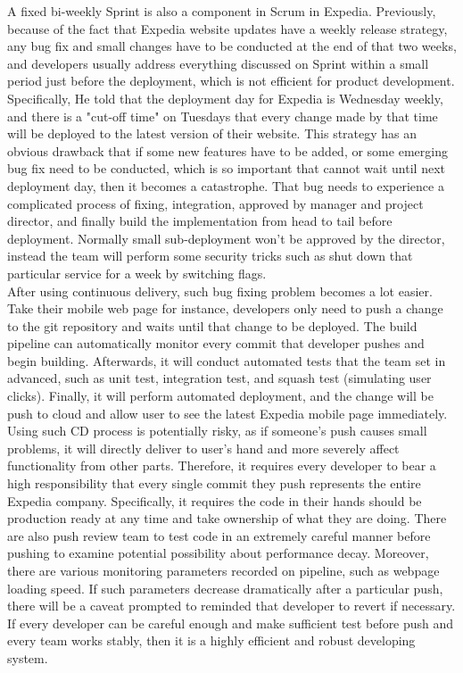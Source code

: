 \documentclass[11pt]{article}
\begin{document}
A fixed bi-weekly Sprint is also a component in Scrum in Expedia. Previously, because of the fact that Expedia website updates have a weekly release strategy, any bug fix and small changes have to be conducted at the end of that two weeks, and developers usually address everything discussed on Sprint within a small period just before the deployment, which is not efficient for product development. Specifically, He told that the deployment day for Expedia is Wednesday weekly, and there is a "cut-off time" on Tuesdays that every change made by that time will be deployed to the latest version of their website. This strategy has an obvious drawback that if some new features have to be added, or some emerging bug fix need to be conducted, which is so important that cannot wait until next deployment day, then it becomes a catastrophe. That bug needs to experience a complicated process of fixing, integration, approved by manager and project director, and finally build the implementation from head to tail before deployment. Normally small sub-deployment won't be approved by the director, instead the team will perform some security tricks such as shut down that particular service for a week by switching flags. \\[10px]
After using continuous delivery, such bug fixing problem becomes a lot easier. Take their mobile web page for instance, developers only need to push a change to the git repository and waits until that change to be deployed. The build pipeline can automatically monitor every commit that developer pushes and begin building. Afterwards, it will conduct automated tests that the team set in advanced, such as unit test, integration test, and squash test (simulating user clicks). Finally, it will perform automated deployment, and the change will be push to cloud and allow user to see the latest Expedia mobile page immediately. Using such CD process is potentially risky, as if someone's push causes small problems, it will directly deliver to user's hand and more severely affect functionality from other parts. Therefore, it requires every developer to bear a high responsibility that every single commit they push represents the entire Expedia company. Specifically, it requires the code in their hands should be production ready at any time and take ownership of what they are doing. There are also push review team to test code in an extremely careful manner before pushing to examine potential possibility about performance decay. Moreover, there are various monitoring parameters recorded on pipeline, such as webpage loading speed. If such parameters decrease dramatically after a particular push, there will be a caveat prompted to reminded that developer to revert if necessary. If every developer can be careful enough and make sufficient test before push and every team works stably, then it is a highly efficient and robust developing system. \\[10px]
\end{document}
